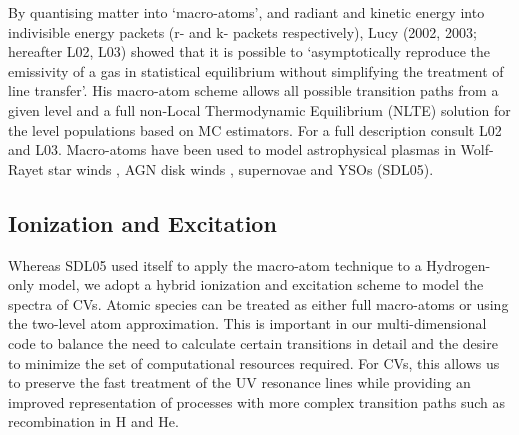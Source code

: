 \documentclass[preprint, a4paper, 11pt]{aastex}
\begin{document}
{By quantising matter into `macro-atoms', and radiant and kinetic 
energy into indivisible energy packets (r- and k- packets respectively), 
Lucy (2002, 2003\nocite{lucy2002, lucy2003}; hereafter L02, L03) showed that it is possible 
to `asymptotically reproduce the emissivity of a gas in statistical equilibrium 
without simplifying the treatment of line transfer'. 
His macro-atom scheme allows all possible transition paths from a given level and a full non-Local 
Thermodynamic Equilibrium (NLTE) solution for the level populations based on MC estimators. 
For a full description consult L02 and L03. 
Macro-atoms have been used to model astrophysical plasmas in 
Wolf-Rayet star winds \citep{sim2004}, AGN disk winds \citep{simlong2008, tatum2012},
supernovae \citep{kasen2006, kerzendorfsim} and YSOs (SDL05).


\subsection{Ionization and Excitation}

Whereas SDL05 used \py itself to apply the macro-atom 
technique to a Hydrogen-only model, we
adopt a hybrid ionization and excitation scheme to model the spectra of CVs. 
Atomic species can be treated as either full macro-atoms
or using the two-level atom approximation.  This is  important in our multi-dimensional code to balance the need to calculate certain transitions in detail and the desire to minimize the set of
computational resources required.  For CVs, this allows us 
to preserve the fast treatment of the UV resonance lines while providing 
an improved representation of processes with more complex
transition paths such as recombination in H and He. 




}
\end{document}
